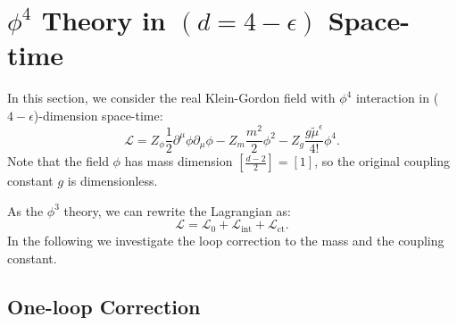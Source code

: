 \section{$\phi^4$ Theory in $(d=4-\epsilon)$ Space-time}
In this section, we consider the real Klein-Gordon field with $\phi^4$ interaction in ($4-\epsilon$)-dimension space-time:
\begin{equation}
	\mathcal{L}
	= Z_{\phi}\frac{1}{2} \partial^\mu\phi\partial_\mu\phi - 
	Z_m \frac{m^2}{2}\phi^2 - Z_g\frac{g \tilde{\mu}^\epsilon}{4!}\phi^4.
\end{equation}
Note that the field $\phi$ has mass dimension $[\frac{d-2}{2}]=[1]$, so the original coupling constant $g$ is dimensionless.

As the $\phi^3$ theory, we can rewrite the Lagrangian as:
\begin{equation}
	\mathcal L = \mathcal L_0 + \mathcal L_{\mathrm{int}} + \mathcal L_{\mathrm{ct}}.
\end{equation}
In the following we investigate the loop correction to the mass and the coupling constant.


\subsection{One-loop Correction}
